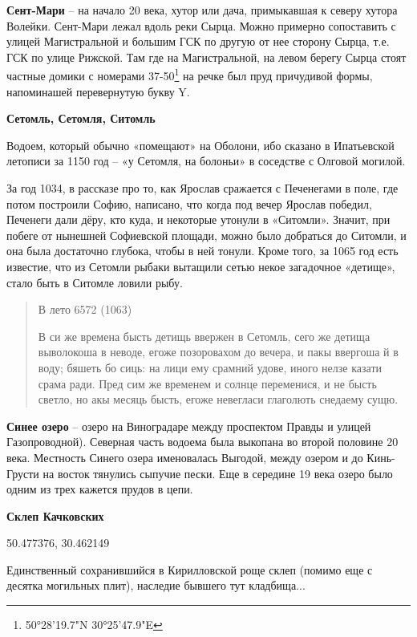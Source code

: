 \textbf{Сент-Мари} – на начало 20 века, хутор или дача, примыкавшая к северу хутора Волейки. Сент-Мари лежал вдоль реки Сырца. Можно примерно сопоставить с улицей Магистральной и большим ГСК по другую от нее сторону Сырца, т.е. ГСК по улице Рижской. Там где на Магистральной, на левом берегу Сырца стоят частные домики с номерами 37-50\footnote{50°28'19.7"N 30°25'47.9"E} на речке был пруд причудивой формы, напоминашей перевернутую букву Y.\\

\medskip

\textbf{Сетомль, Сетомля, Ситомль} 

Водоем, который обычно «помещают» на Оболони, ибо сказано в Ипатьевской летописи за 1150 год – «у Сетомля, на болоньи» в соседстве с Олговой могилой. 

За год 1034, в рассказе про то, как Ярослав сражается с Печенегами в поле, где потом построили Софию, написано, что когда под вечер Ярослав победил, Печенеги дали дёру, кто куда, и некоторые утонули в «Ситомли». Значит, при побеге от нынешней Софиевской площади, можно было добраться до Ситомли, и она была достаточно глубока, чтобы в ней тонули. Кроме того, за 1065 год есть известие, что из Сетомли рыбаки вытащили сетью некое загадочное «детище», стало быть в Ситомле ловили рыбу.

\begin{quotation}
В лето 6572 (1063)

В си же времена бысть детищь ввержен в Сетомль, сего же детища выволокоша в неводе, егоже позоровахом до вечера, и пакы ввергоша й в воду; бяшеть бо сиць: на лици ему срамний удове, иного нелзе казати срама ради. Пред сим же временем и солнце переменися, и не бысть светло, но акы месяць бысть, егоже невегласи глаголють снедаему сущю.
\end{quotation}

\medskip

\textbf{Синее озеро} – озеро на Виноградаре между проспектом Правды и улицей Газопроводной). Северная часть водоема была выкопана во второй половине 20 века. Местность Синего озера именовалась Выгодой, между озером и до Кинь-Грусти на восток тянулись сыпучие пески. Еще в середине 19 века озеро было одним из трех кажется прудов в цепи.\\

\medskip

\textbf{Склеп Качковских}

50.477376, 30.462149

Единственный сохранившийся в Кирилловской роще склеп (помимо еще с десятка могильных плит), наследие бывшего тут кладбища... 


